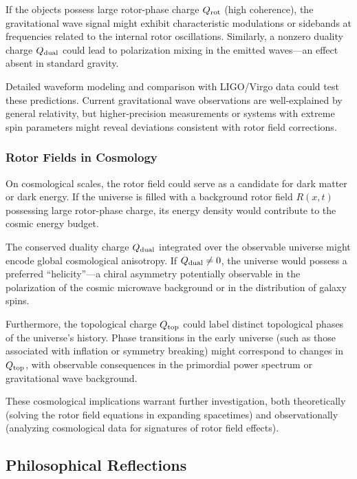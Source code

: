 \documentclass[11pt,a4paper]{article}
\numberwithin{equation}{section}
\theoremstyle{plain}
\theoremstyle{definition}
\theoremstyle{remark}
\begin{document}
If the objects possess large rotor-phase charge $Q_{\rm rot}$ (high coherence), the gravitational wave signal might exhibit characteristic modulations or sidebands at frequencies related to the internal rotor oscillations. Similarly, a nonzero duality charge $Q_{\rm dual}$ could lead to polarization mixing in the emitted waves---an effect absent in standard gravity.

Detailed waveform modeling and comparison with LIGO/Virgo data could test these predictions. Current gravitational wave observations are well-explained by general relativity, but higher-precision measurements or systems with extreme spin parameters might reveal deviations consistent with rotor field corrections.

\subsubsection{Rotor Fields in Cosmology}

On cosmological scales, the rotor field could serve as a candidate for dark matter or dark energy. If the universe is filled with a background rotor field $R(x,t)$ possessing large rotor-phase charge, its energy density would contribute to the cosmic energy budget.

The conserved duality charge $Q_{\rm dual}$ integrated over the observable universe might encode global cosmological anisotropy. If $Q_{\rm dual} \neq 0$, the universe would possess a preferred ``helicity''---a chiral asymmetry potentially observable in the polarization of the cosmic microwave background or in the distribution of galaxy spins.

Furthermore, the topological charge $Q_{\rm top}$ could label distinct topological phases of the universe's history. Phase transitions in the early universe (such as those associated with inflation or symmetry breaking) might correspond to changes in $Q_{\rm top}$, with observable consequences in the primordial power spectrum or gravitational wave background.

These cosmological implications warrant further investigation, both theoretically (solving the rotor field equations in expanding spacetimes) and observationally (analyzing cosmological data for signatures of rotor field effects).

\subsection{Philosophical Reflections}
\end{document}
